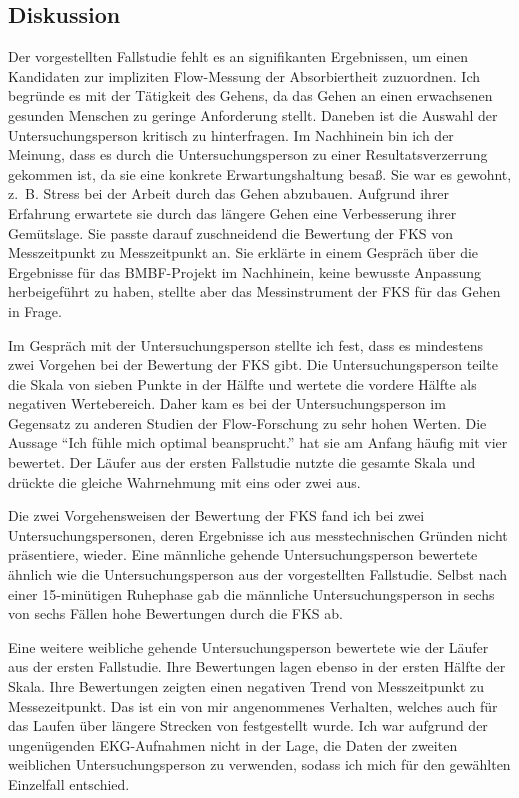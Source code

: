 

\subsection{Diskussion}
\label{sub:diskussion_2}
Der vorgestellten Fallstudie fehlt es an signifikanten Ergebnissen, um einen Kandidaten zur impliziten Flow-Messung der Absorbiertheit zuzuordnen. Ich begründe es mit der Tätigkeit des Gehens, da das Gehen an einen erwachsenen gesunden Menschen zu geringe Anforderung stellt. Daneben ist die Auswahl der Untersuchungsperson kritisch zu hinterfragen. Im Nachhinein bin ich der Meinung, dass es durch die Untersuchungsperson zu einer Resultatsverzerrung gekommen ist, da sie eine konkrete Erwartungshaltung besaß. Sie war es gewohnt, z.~B. Stress bei der Arbeit durch das Gehen abzubauen. Aufgrund ihrer Erfahrung erwartete sie durch das längere Gehen eine Verbesserung ihrer Gemütslage. Sie passte darauf zuschneidend die Bewertung der \ac{FKS} von Messzeitpunkt zu Messzeitpunkt an. Sie erklärte in einem Gespräch über die Ergebnisse für das \acs{BMBF}-Projekt im Nachhinein, keine bewusste Anpassung herbeigeführt zu haben, stellte aber das Messinstrument der \ac{FKS} für das Gehen in Frage.

Im Gespräch mit der Untersuchungsperson stellte ich fest, dass es mindestens zwei Vorgehen bei der Bewertung der \ac{FKS} gibt. Die Untersuchungsperson teilte die Skala von sieben Punkte in der Hälfte und wertete die vordere Hälfte als negativen Wertebereich. Daher kam es bei der Untersuchungsperson im Gegensatz zu anderen Studien der Flow-Forschung zu sehr hohen Werten. Die Aussage "`Ich fühle mich optimal beansprucht."' hat sie am Anfang häufig mit vier bewertet. Der Läufer aus der ersten Fallstudie nutzte die gesamte Skala und drückte die gleiche Wahrnehmung mit eins oder zwei aus. 

Die zwei Vorgehensweisen der Bewertung der \ac{FKS} fand ich bei zwei Untersuchungspersonen, deren Ergebnisse ich aus messtechnischen Gründen nicht präsentiere, wieder. Eine männliche gehende Untersuchungsperson bewertete ähnlich wie die Untersuchungsperson aus der vorgestellten Fallstudie. Selbst nach einer 15-minütigen Ruhephase gab die männliche Untersuchungsperson in sechs von sechs Fällen hohe Bewertungen durch die \ac{FKS} ab.

Eine weitere weibliche gehende Untersuchungsperson bewertete wie der Läufer aus der ersten Fallstudie. Ihre Bewertungen lagen ebenso in der ersten Hälfte der Skala. Ihre Bewertungen zeigten einen negativen Trend von Messzeitpunkt zu Messezeitpunkt. Das ist ein von mir angenommenes Verhalten, welches auch für das Laufen über längere Strecken von \citet{Schuler2009} festgestellt wurde. Ich war aufgrund der ungenügenden \ac{EKG}-Aufnahmen nicht in der Lage, die Daten der zweiten weiblichen Untersuchungsperson zu verwenden, sodass ich mich für den gewählten Einzelfall entschied.

